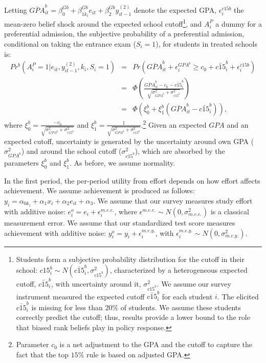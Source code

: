 Letting $\overline{GPA}^b_{it}=\beta^{Gb}_{0}+\beta^{Gb}_{1k_i} e_{it} +\beta^{Gb}_2 y^{(2)}_{it-1}$ denote the expected GPA, $\epsilon_i^{c15b}$ the mean-zero belief shock around the expected school cutoff\footnote{Students form a subjective probability distribution for the cutoff in their school:  $c15^b_i\sim N(\bar{c15}^b_i,\sigma^2_{c15^b})$, characterized by a heterogeneous expected cutoff, $\bar{c15}^b_i$, with uncertainty around it, $\sigma^2_{c15^b}$. We assume our survey instrument measured the expected cutoff $\bar{c15}^b_i$ for each student $i$. The elicited $\bar{c15}^b_i$ is missing for less than $20\%$ of students. We assume these students correctly predict the cutoff; thus, results provide a lower bound to the role that biased rank beliefs play in policy response.}, and $A_i^P$ a dummy for a preferential admission, the subjective probability of a preferential admission, conditional on taking the entrance exam ($S_i=1$), for students in treated schools is:
\vspace{-10pt}
\begin{eqnarray}\label{eq:pr_Pb}
	Pr^b(A^P_i=1|e_{it},y_{it-1}^{(2)},k_i,S_i=1)&=&Pr\left( \overline{GPA}^b_{it}+\epsilon_i^{GPA^b}\geq c_0+\bar{c15}^b_i+\epsilon_i^{c15b} \right)\\ \nonumber
	&=&\Phi \left( \frac{\overline{GPA}^b_{it}-c_0- \bar{c15}_i^b}{\sqrt{\sigma^2_{GPA^b}+\sigma^2_{c15^b}}}\right) \\ \nonumber
	&=&\Phi\left(\xi_0^b+\xi_1^b (\overline{GPA}^b_{it}-\bar{c15}_i^b)\right),
\end{eqnarray}
\noindent where $\xi_0^b=\frac{-c_0}{\sqrt{\sigma^2_{GPA^b}+\sigma^2_{c15^b}}}$ and $\xi_1^b=\frac{1}{\sqrt{\sigma^2_{GPA^b}+\sigma^2_{c15^b}}}$.\footnote{Parameter $c_0$ is a net adjustment to the GPA and the cutoff to capture the fact that the top $15\%$ rule is based on adjusted GPA. } Given an expected $GPA$ and an expected cutoff, uncertainty is generated by the uncertainty around own GPA ($\sigma^2_{GPA^b}$) and around the school cutoff ($\sigma^2_{c15^b}$), which are absorbed by the parameters $\xi_0^b$ and $\xi_1^b$. As before, we assume normality. \par 

In the first period, the per-period utility from effort depends on how effort affects achievement. We assume achievement is produced as follows: $y_{i}=\alpha_{0k_i}+ \alpha_1 x_i +\alpha_2 e_{it} +\alpha_3$. We assume that our survey measures study effort with additive noise:  $e_i^o=e_i+\epsilon_i^{m.e.e.}$, where $\epsilon^{m.e.e.}\sim N(0,\sigma^2_{m.e.e.})$ is a classical measurement error. We assume that our standardized test score measures achievement with additive noise: $y_i^o=y_i+\epsilon_i^{m.e.y.}$, with $\epsilon_i^{m.e.y.}\sim N(0,\sigma^2_{m.e.y.})$.\par 

